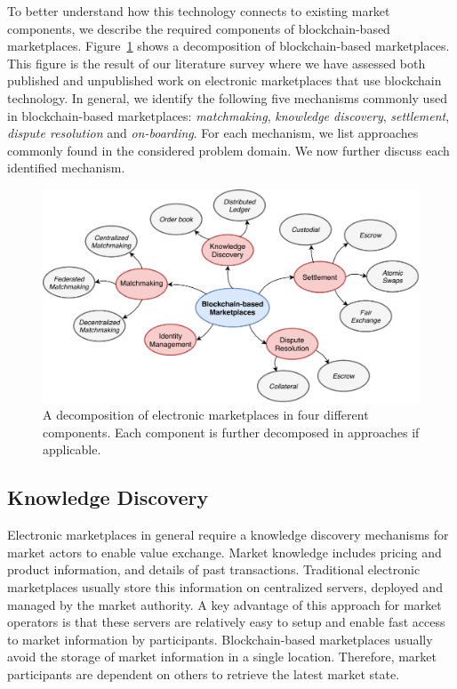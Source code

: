 To better understand how this technology connects to existing market components, we describe the required components of blockchain-based marketplaces.
Figure~\ref{fig:electronic_markets} shows a decomposition of blockchain-based marketplaces.
This figure is the result of our literature survey where we have assessed both published and unpublished work on electronic marketplaces that use blockchain technology.
In general, we identify the following five mechanisms commonly used in blockchain-based marketplaces: \emph{matchmaking}, \emph{knowledge discovery}, \emph{settlement}, \emph{dispute resolution} and \emph{on-boarding}.
For each mechanism, we list approaches commonly found in the considered problem domain.
We now further discuss each identified mechanism. %

\begin{figure}[t]
	\centering
	\includegraphics[width=\linewidth]{introduction/assets/decomposition}
	\caption{A decomposition of electronic marketplaces in four different components. Each component is further decomposed in approaches if applicable.}
	\label{fig:electronic_markets}
\end{figure}

\subsection{Knowledge Discovery}
Electronic marketplaces in general require a knowledge discovery mechanisms for market actors to enable value exchange.
Market knowledge includes pricing and product information, and details of past transactions.
Traditional electronic marketplaces usually store this information on centralized servers, deployed and managed by the market authority.
A key advantage of this approach for market operators is that these servers are relatively easy to setup and enable fast access to market information by participants.
Blockchain-based marketplaces usually avoid the storage of market information in a single location.
Therefore, market participants are dependent on others to retrieve the latest market state.


